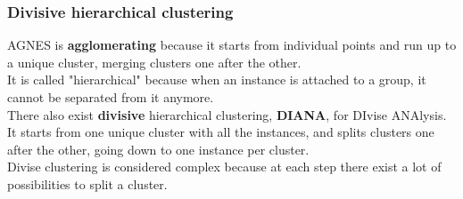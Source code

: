 \begin{frame}
\frametitle{Divisive hierarchical clustering}
AGNES is {\bf agglomerating} because it starts from individual points and run up to a unique cluster, merging clusters one after the other. \\
\vspace{0.3cm}
It is called "hierarchical" because when an instance is attached to a group, it cannot be separated from it anymore.\\
\vspace{0.3cm} 
There also exist {\bf divisive} hierarchical clustering, {\bf DIANA}, for DIvise ANAlysis. It starts from one unique cluster with all the instances, and splits clusters one after the other, going down to one instance per cluster. \\
\vspace{0.3cm} 
Divise clustering is considered complex because at each step there exist a lot of possibilities to split a cluster.
\end{frame}
